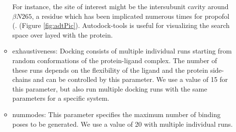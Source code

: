 \documentclass[12pt]{article}
\begin{document}
\begin{itemize}
\begin{itemize}
			For instance, the site of interest might be the intersubunit cavity around  $\beta N265$, a residue which has been implicated numerous times for propofol (\cite{Jurd2002, Stewart2014, Stern2016,Chiara2016a}.  (Figure \ref{fig:adtPic}). %
			Autodock-tools is useful for visualizing the search space over layed with the protein. 
			\item exhaustiveness: Docking consists of multiple individual runs starting from random conformations of the protein-ligand complex. The number of these runs depends on the flexibility of the ligand and the protein side-chains and can be controlled  by this parameter. We use a value of 15 for this parameter, but also run multiple docking runs with the same parameters  for a specific system.
			\item nummodes: This parameter specifies the maximum number of binding poses to be generated. We use a value of 20 with multiple individual runs.
\end{itemize}
\end{itemize}
\end{document}
